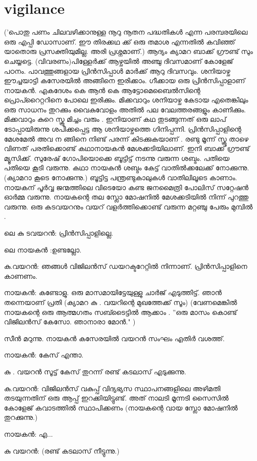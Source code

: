 \documentclass[10pt,a4paper]{report}
\begin{document}
\section{vigilance }
('പൊതു പണം ചിലവഴിക്കാനുള്ള നൂറു നൂതന പദ്ധതികൾ എന്ന പരമ്പരയിലെ ഒരു എപ്പി ഡോസാണ്. ഈ തിരക്കഥ ക്ക് ഒരു തമാശ എന്നതിൽ കവിഞ്ഞ് യാതൊരു പ്രസക്തിയുമില്ല. അരി പ്രശ്നമാണ്.) ആദ്യം ക്യാമറ ബാക്ക് ഗ്രൗണ്ട് സും ചെയ്യട്ടെ. (വിവരണം)പിള്ളേർക്ക് ആഴ്ചയിൽ അഞ്ചു ദിവസമാണ് കോളേജ് പഠനം. പാവത്തുങ്ങളായ പ്രിൻസിപ്പാൾ മാർക്ക് ആറു ദിവസവും. ശനിയാഴ്ച ഈച്ചയാട്ടി കസേരയിൽ അങ്ങിനെ ഇരിക്കാം. ഗീക്കായ ഒരു പ്രിൻസിപ്പാളാണ് നായകൻ. എകദേശം കെ ആൻ കെ ആട്ടോമെബൈൽസിന്റെ പ്രൊപ്റൈറ്ററിനെ പോലെ ഇരിക്കും. മിക്കവാറും ശനിയാഴ്ച കേടായ എതെങ്കിലും ഒരു സാധനം തുറക്കും വൈകുവോളം അതിൽ പല വേലത്തരങ്ങളും കാണിക്കും. മിക്കവാറും കുറെ സ്ക്രൂ മിച്ചം വരും . ഇനിയാണ് കഥ തുടങ്ങുന്നത് ഒരു ലാപ് ടോപ്പായിരുന്നു ശപിക്കപ്പെട്ട ആ ശനിയാഴ്ചത്തെ ഗിനിപ്പന്നി. പ്രിൻസിപ്പാളിന്റെ മേശമേൽ അവ ന ങ്ങിനെ നിണ്ട് പരന്ന് കിടക്കുകയാണ് . രണ്ടു മൂന്ന് സ്ക്രൂ താഴെ വിണത് പരതിക്കൊണ്ട് കഥാനായകൻ മേശക്കടിയിലാണ്. ഇനി ബാക്ക് ഗ്രൗണ്ട് മ്യൂസിക്ക്. സുരേഷ് ഗോപിയൊക്കെ ബൂട്ടിട്ട് നടന്നു വരുന്ന ശബ്ദം. പതിയെ പതിയെ കൂടി വരുന്നു. കഥാ നായകൻ ശബ്ദം കേട്ട് വാതിൽക്കലേക്ക് നോക്കുന്നു. (ക്യാമറാ കൂടെ നോക്കുന്നു.) ബൂട്ടിട്ട പന്ത്രണ്ടുകാലുകൾ വാതിലിലൂടെ കാണാം. നായകന് പൂർവ്വ ജന്മത്തിലെ വിടെയോ കണ്ട ജനമൈത്രി പോലിസ് സറ്റേഷൻ ഓർമ്മ വരുന്നു. നായകന്റെ തല സ്ലോ മോഷനിൽ മേശക്കടിയിൽ നിന്ന് പുറത്തു വരുന്നു. ഒരു കടവയറനും വയറ് വളർത്തിക്കൊണ്ട് വരുന്ന മറ്റഞ്ചു പേരും മുമ്പിൽ .

 ലെ കു ടവയറൻ: പ്രിൻസിപ്പാളില്ലെ. 
 
 ലെ നായകൻ :ഉണ്ടല്ലോ.
 
  കു.വയറൻ: ഞങ്ങൾ വിജിലൻസ് ഡയറക്ടറേറ്റിൽ നിന്നാണ്. പ്രിൻസിപ്പാളിനെ കാണണം. 
  
  നായകൻ: കണ്ടോളു. ഒരു മാസമായിട്ടേയുള്ളു ചാർജ് എടുത്തിട്ട്. ഞാൻ തന്നെയാണ് പ്രതി (ക്യാമറ കു . വയറിന്റെ മുഖത്തേക്ക് സൂം) (വേണമെങ്കിൽ നായകന്റെ ഒരു ആത്മഗതം സബ്ടൈട്ടിൽ ആക്കാം . ''ഒരു മാസം കൊണ്ട് വിജിലൻസ് കേസോ. ഞാനാരാ മോൻ." ) 
  
  സീൻ മറുന്നു. നായകൻ കസേരയിൽ വയറൻ സംഘം എതിർ വശത്ത്. 
  
  നായകൻ: കേസ് എന്താ. 
  
  കു . വയറൻ സൂട്ട് കേസ് തുറന്ന് രണ്ട് കടലാസ് എടുക്കുന്നു. 
  
  കു.വയറൻ: വിജിലൻസ് വകുപ്പ് വിദ്യഭ്യസ സ്ഥാപനങ്ങളിലെ അഴിമതി തടയുന്നതിന് ഒരു ആപ്പ് ഇറക്കിയിട്ടുണ്ട്. അത് നാലടി മൂന്നടി സൈസിൽ കോളേജ് കവാടത്തിൽ സ്ഥാപിക്കണം (നായകന്റെ വായ സ്ലോ മോഷനിൽ തുറക്കുന്നു.) 
  
നായകൻ: എ... 

കു വയറൻ: (രണ്ട് കടലാസ് നീട്ടുന്നു.) 
\end{document}
